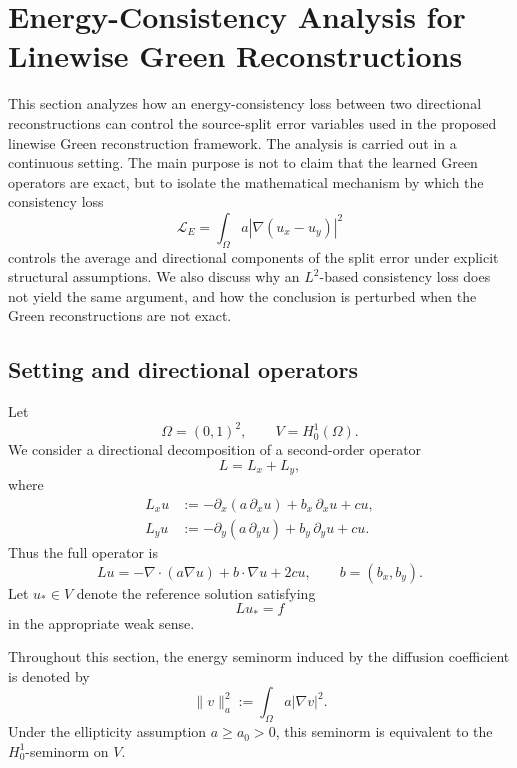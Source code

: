\documentclass[11pt]{article}
\begin{document}
\section{Energy-Consistency Analysis for Linewise Green Reconstructions}
\label{sec:energy-consistency-analysis}

This section analyzes how an energy-consistency loss between two
directional reconstructions can control the source-split error variables
used in the proposed linewise Green reconstruction framework.  The
analysis is carried out in a continuous setting.  The main purpose is not
to claim that the learned Green operators are exact, but to isolate the
mathematical mechanism by which the consistency loss
\[
    \mathcal L_E
    =
    \int_\Omega a |\nabla(u_x-u_y)|^2
\]
controls the average and directional components of the split error under
explicit structural assumptions.  We also discuss why an \(L^2\)-based
consistency loss does not yield the same argument, and how the conclusion
is perturbed when the Green reconstructions are not exact.

\subsection{Setting and directional operators}
\label{subsec:setting-directional-operators}

Let
\[
    \Omega=(0,1)^2,
    \qquad
    V=H_0^1(\Omega).
\]
We consider a directional decomposition of a second-order operator
\[
    L = L_x + L_y,
\]
where
\begin{align}
    L_x u
    &:=
    -\partial_x\!\left(a\,\partial_x u\right)
    + b_x\,\partial_x u
    + c u,
    \label{eq:Lx-definition}
    \\
    L_y u
    &:=
    -\partial_y\!\left(a\,\partial_y u\right)
    + b_y\,\partial_y u
    + c u.
    \label{eq:Ly-definition}
\end{align}
Thus the full operator is
\begin{equation}
    L u
    =
    -\nabla\cdot(a\nabla u)
    + b\cdot\nabla u
    + 2c u,
    \qquad
    b=(b_x,b_y).
    \label{eq:L-full-definition}
\end{equation}
Let \(u_*\in V\) denote the reference solution satisfying
\begin{equation}
    L u_* = f
    \label{eq:reference-problem}
\end{equation}
in the appropriate weak sense.

Throughout this section, the energy seminorm induced by the diffusion
coefficient is denoted by
\begin{equation}
    \|v\|_a^2
    :=
    \int_\Omega a |\nabla v|^2.
    \label{eq:energy-norm}
\end{equation}
Under the ellipticity assumption \(a\ge a_0>0\), this seminorm is
equivalent to the \(H_0^1\)-seminorm on \(V\).
\end{document}

